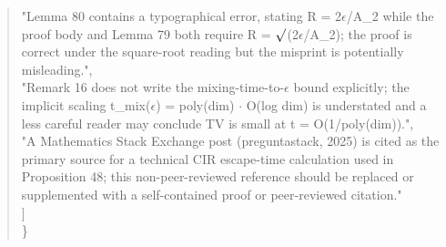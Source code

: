 \documentclass[11pt]{article}
\begin{document}
\begin{quote}
    "Lemma 80 contains a typographical error, stating R = 2\ensuremath{\epsilon}/A\_2 while the proof body and Lemma 79 both require R = \ensuremath{\surd}(2\ensuremath{\epsilon}/A\_2); the proof is correct under the square-root reading but the misprint is potentially misleading.",\\
    "Remark 16 does not write the mixing-time-to-\ensuremath{\epsilon} bound explicitly; the implicit scaling t\_mix(\ensuremath{\epsilon}) = poly(dim) \ensuremath{\cdot} O(log dim) is understated and a less careful reader may conclude TV is small at t = O(1/poly(dim)).",\\
    "A Mathematics Stack Exchange post (preguntastack, 2025) is cited as the primary source for a technical CIR escape-time calculation used in Proposition 48; this non-peer-reviewed reference should be replaced or supplemented with a self-contained proof or peer-reviewed citation."\\
  ]\\
\}\\
\end{quote}
\end{document}
